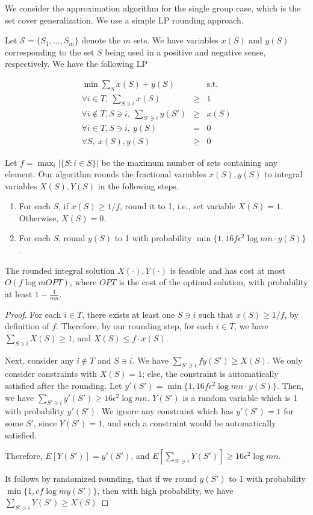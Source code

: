 \documentclass[twoside, leqno, twocolumn]{article}
\begin{document}
We consider the approximation algorithm for the single group case, which 
is the set cover generalization. We use a simple LP rounding approach.

Let $\mathcal{S} = \{S_1,\ldots,S_m\}$ denote the $m$ sets. We have variables
$x(S)$ and $y(S)$ corresponding to the set $S$ being used in a positive and negative 
sense, respectively. We have the following LP

\begin{eqnarray*}
\min \sum_S x(S) + y(S) && \text{s.t.}\\
\forall i\in T,\ \sum_{S\ni i} x(S) &\geq& 1\\
\forall i\not\in T, S\ni i,\ \sum_{S'\ni i} y(S') &\geq& x(S)\\
\forall i\in T, S\ni i,\ y(S) &=& 0\\
\forall S,\ x(S), y(S) &\geq& 0
\end{eqnarray*}

Let $f=\max_i |\{S: i\in S\}|$ be the maximum number of sets containing any element.
Our algorithm rounds the fractional variables $x(S), y(S)$ to integral variables
$X(S), Y(S)$ in the following steps.
\begin{enumerate}
\item
For each $S$, if $x(S)\geq 1/f$, round it to 1, i.e., set 
variable $X(S)=1$. Otherwise, $X(S)=0$.
\item
For each $S$, round $y(S)$ to 1 with probability 
$\min\{1, 16f{\epsilon^2}\log{mn}\cdot y(S)\}$.
\end{enumerate}

\begin{lemma}
The rounded integral solution $X(\cdot), Y(\cdot)$ is feasible and has
cost at most $O(f\log{m} OPT)$, where $OPT$ is the cost of the optimal solution,
with probability at least $1-\frac{1}{mn}$.
\end{lemma}

\begin{proof}
For each $i\in T$, there exists at least one $S\ni i$ such that $x(S)\geq 1/f$,
by definition of $f$. Therefore, by our rounding step, 
for each $i\in T$, we have $\sum_{S\ni i} X(S)\geq 1$, and
$X(S)\leq f\cdot x(S)$.

Next, consider any $i\not\in T$ and $S\ni i$. We have
$\sum_{S'\ni i} fy(S') \geq X(S)$. We only consider constraints with $X(S)=1$; 
else, the constraint is automatically satisfied after the rounding.
Let $y'(S') = \min\{1, 16f{\epsilon^2}\log{mn}\cdot y(S)\}$.
Then, we have $\sum_{S'\ni i} y'(S') \geq 16\epsilon^2\log{mn}$.
$Y(S')$ is a random variable which is 1 with probability $y'(S')$. 
We ignore any constraint which has $y'(S')=1$ for some $S'$, since $Y(S')=1$,
and such a constraint would be automatically satisfied.

Therefore,
$E[Y(S')] = y'(S')$, and $E[\sum_{S'\ni i} Y(S')] \geq 16\epsilon^2\log{mn}$.

It follows by randomized rounding, that if
we round $y(S')$ to 1 with probability $\min\{1, cf\log{m} y(S')\}$, then with high
probability, we have $\sum_{S'\ni i} Y(S')\geq X(S)$
\end{proof}
\end{document}
